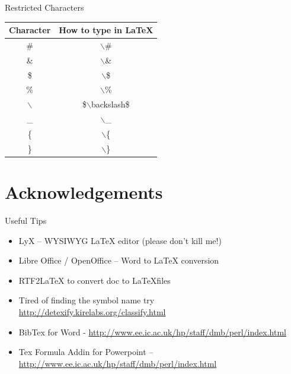 \documentclass[10pt,times]{beamer}
\begin{document}

\begin{frame}{Restricted Characters}
\begin{table}
\begin{tabular}{cc}
\hline
\textbf{Character} & \textbf{How to type in LaTeX} \\  \hline
\# & $\backslash$\# \\ 
\& & $\backslash$\& \\ 
\$ & $\backslash$\$ \\
\% & $\backslash$\% \\ 
$\backslash$ & \$$\backslash$backslash\$ \\ 
\_ & $\backslash$\_ \\
\{ & $\backslash$\{ \\
\} & $\backslash$\} \\

\end{tabular}
\end{table}
\end{frame}





\section{Acknowledgements}
\begin{frame}{Useful Tips}
\begin{itemize}
\item LyX – WYSIWYG LaTeX editor (please don’t kill me!)
\item Libre Office / OpenOffice – Word to LaTeX conversion
\item RTF2LaTeX to convert doc to \LaTeX files
\item Tired of finding the symbol name try \href{http://detexify.kirelabs.org/classify.html}{http://detexify.kirelabs.org/classify.html}
\item BibTex for Word - \href{http://www.ee.ic.ac.uk/hp/staff/dmb/perl/index.html}{http://www.ee.ic.ac.uk/hp/staff/dmb/perl/index.html}
\item Tex Formula Addin for Powerpoint – \href{http://users.ecs.soton.ac.uk/srg/softwaretools/presentation/TeX4PPT/}{http://www.ee.ic.ac.uk/hp/staff/dmb/perl/index.html} 
\end{itemize}
\end{frame}
\end{document}
